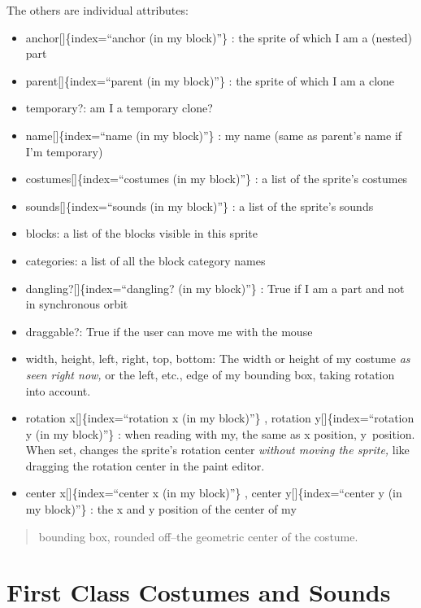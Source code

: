 \documentclass[
  letterpaper,
]{book}
\begin{document}
The others are individual attributes:

\begin{itemize}
\item
  anchor{[}{]}\{index=``anchor (in my block)''\} : the sprite of which I
  am a (nested) part
\item
  parent{[}{]}\{index=``parent (in my block)''\} : the sprite of which I
  am a clone
\item
  temporary?: am I a temporary clone?
\item
  name{[}{]}\{index=``name (in my block)''\} : my name (same as parent's
  name if I'm temporary)
\item
  costumes{[}{]}\{index=``costumes (in my block)''\} : a list of the
  sprite's costumes
\item
  sounds{[}{]}\{index=``sounds (in my block)''\} : a list of the
  sprite's sounds
\item
  blocks: a list of the blocks visible in this sprite
\item
  categories: a list of all the block category names
\item
  dangling?{[}{]}\{index=``dangling? (in my block)''\} : True if I am a
  part and not in synchronous orbit
\item
  draggable?: True if the user can move me with the mouse
\item
  width, height, left, right, top, bottom: The width or height of my
  costume \emph{as seen right now,} or the left, etc., edge of my
  bounding box, taking rotation into account.
\item
  rotation x{[}{]}\{index=``rotation x (in my block)''\} , rotation
  y{[}{]}\{index=``rotation y (in my block)''\} : when reading with my,
  the same as x position, y~position. When set, changes the sprite's
  rotation center \emph{without moving the sprite,} like dragging the
  rotation center in the paint editor.
\item
  center x{[}{]}\{index=``center x (in my block)''\} , center
  y{[}{]}\{index=``center y (in my block)''\} : the x and y position of
  the center of my
\end{itemize}

\begin{quote}
bounding box, rounded oﬀ--the geometric center of the costume.
\end{quote}

\section{First Class Costumes and
Sounds}\label{first-class-costumes-and-sounds}
\end{document}

